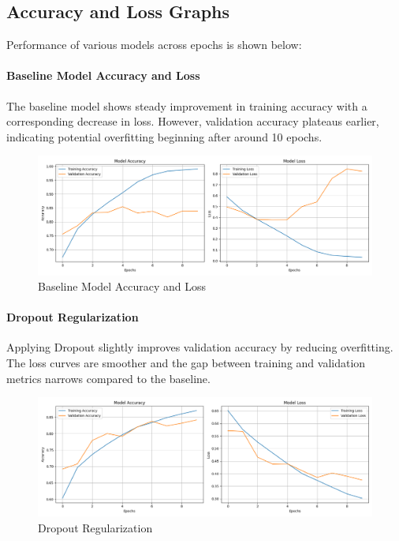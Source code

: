 \documentclass{article}
\begin{document}
\subsection*{Accuracy and Loss Graphs}
Performance of various models across epochs is shown below:

\paragraph{Baseline Model Accuracy and Loss}
The baseline model shows steady improvement in training accuracy with a corresponding decrease in loss. However, validation accuracy plateaus earlier, indicating potential overfitting beginning after around 10 epochs.

\begin{figure}[H]
\centering
\includegraphics[width=0.9\linewidth]{baseline_accuracy_loss.png}
\caption{Baseline Model Accuracy and Loss}
\end{figure}

\paragraph{Dropout Regularization}
Applying Dropout slightly improves validation accuracy by reducing overfitting. The loss curves are smoother and the gap between training and validation metrics narrows compared to the baseline.

\begin{figure}[H]
\centering
\includegraphics[width=0.9\linewidth]{dropout_accuracy_loss.png}
\caption{Dropout Regularization}
\end{figure}
\end{document}
